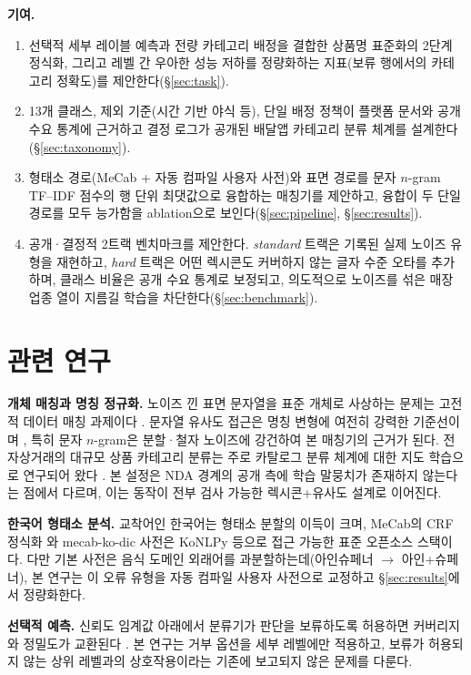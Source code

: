 \documentclass[10pt,twocolumn]{article}
\begin{document}
\smallskip
\noindent\textbf{기여.}
\begin{enumerate}
\item 선택적 세부 레이블 예측과 전량 카테고리 배정을 결합한 상품명
  표준화의 2단계 정식화, 그리고 레벨 간 우아한 성능 저하를 정량화하는
  지표(보류 행에서의 카테고리 정확도)를 제안한다(\S\ref{sec:task}).
\item 13개 클래스, 제외 기준(시간 기반 야식 등), 단일 배정 정책이 플랫폼
  문서와 공개 수요 통계에 근거하고 결정 로그가 공개된 배달앱 카테고리
  분류 체계를 설계한다(\S\ref{sec:taxonomy}).
\item 형태소 경로(MeCab + 자동 컴파일 사용자 사전)와 표면 경로를 문자
  $n$-gram TF--IDF 점수의 행 단위 최댓값으로 융합하는 매칭기를 제안하고,
  융합이 두 단일 경로를 모두 능가함을 ablation으로
  보인다(\S\ref{sec:pipeline}, \S\ref{sec:results}).
\item 공개·결정적 2트랙 벤치마크를 제안한다. \emph{standard} 트랙은
  기록된 실제 노이즈 유형을 재현하고, \emph{hard} 트랙은 어떤 렉시콘도
  커버하지 않는 글자 수준 오타를 추가하며, 클래스 비율은 공개 수요 통계로
  보정되고, 의도적으로 노이즈를 섞은 매장 업종 열이 지름길 학습을
  차단한다(\S\ref{sec:benchmark}).
\end{enumerate}

\section{관련 연구}
\label{sec:related}

\textbf{개체 매칭과 명칭 정규화.}
노이즈 낀 표면 문자열을 표준 개체로 사상하는 문제는 고전적 데이터 매칭
과제이다 \cite{christen2012}. 문자열 유사도 접근은 명칭 변형에 여전히
강력한 기준선이며 \cite{cohen2003}, 특히 문자 $n$-gram은 분할·철자
노이즈에 강건하여 \cite{cavnar1994,mcnamee2004} 본 매칭기의 근거가 된다.
전자상거래의 대규모 상품 카테고리 분류는 주로 카탈로그 분류 체계에 대한
지도 학습으로 연구되어 왔다 \cite{cevahir2016}. 본 설정은 NDA 경계의
공개 측에 학습 말뭉치가 존재하지 않는다는 점에서 다르며, 이는 동작이
전부 검사 가능한 렉시콘+유사도 설계로 이어진다.

\textbf{한국어 형태소 분석.}
교착어인 한국어는 형태소 분할의 이득이 크며, MeCab의 CRF 정식화
\cite{kudo2004}와 mecab-ko-dic 사전은 KoNLPy \cite{park2014} 등으로
접근 가능한 표준 오픈소스 스택이다. 다만 기본 사전은 음식 도메인
외래어를 과분할하는데(아인슈페너 $\rightarrow$ 아인+슈페너), 본 연구는
이 오류 유형을 자동 컴파일 사용자 사전으로 교정하고
\S\ref{sec:results}에서 정량화한다.

\textbf{선택적 예측.}
신뢰도 임계값 아래에서 분류기가 판단을 보류하도록 허용하면 커버리지와
정밀도가 교환된다 \cite{chow1970,elyaniv2010}. 본 연구는 거부 옵션을
세부 레벨에만 적용하고, 보류가 허용되지 않는 상위 레벨과의 상호작용이라는
기존에 보고되지 않은 문제를 다룬다.
\end{document}
